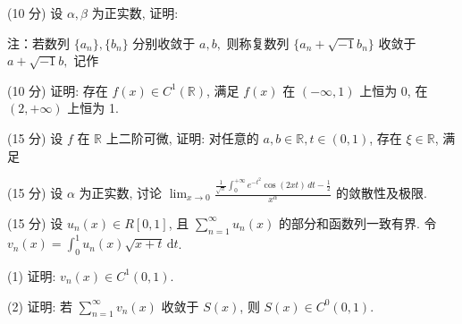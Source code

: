 \par{}
(10 分) 设 $\alpha, \beta$ 为正实数, 证明:\par
\nopagebreak[4]
\par{}
注：若数列 $\{a_{n}\} ,\{b_{n}\}$ 分别收敛于 $a,b,$ 则称复数列 $\{a_n + \sqrt{-1} b_n\}$ 收敛于 $a + \sqrt{-1} b,$ 记作\par
\nopagebreak[4]
(10 分) 证明: 存在 $f(x) \in C^{1}(\mathbb{R})$, 满足 $f(x)$ 在 $(- \infty, 1)$ 上恒为 0, 在 $(2, +\infty)$ 上恒为 1.\par
\par{}
(15 分) 设 $f$ 在 $\mathbb{R}$ 上二阶可微, 证明: 对任意的 $a, b \in \mathbb{R}, t \in (0,1)$, 存在 $\xi \in \mathbb{R}$, 满足\par
\nopagebreak[4]
(15 分) 设 $\alpha$ 为正实数, 讨论 $\lim_{x \to 0} \frac{\frac{1}{\sqrt{\pi}} \int_0^{+\infty} e^{-t^2} \cos(2xt) \, dt - \frac{1}{2}}{x^\alpha}$ 的敛散性及极限.\par
(15 分) 设 $u_{n}(x) \in R[0,1]$, 且 $\sum_{n=1}^{\infty} u_{n}(x)$ 的部分和函数列一致有界. 令 $v_{n}(x) = \int_{0}^{1} u_{n}(x) \sqrt{x + t} \, \mathrm{d}t$.\par
(1) 证明: $v_{n}(x) \in C^{1}(0,1)$.\par
(2) 证明: 若 $\sum_{n=1}^{\infty} v_n(x)$ 收敛于 $S(x)$, 则 $S(x) \in C^0(0,1)$.\par
